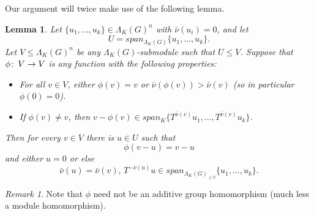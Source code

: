\documentclass{amsart}
\theoremstyle{plain}
\newtheorem{lemma}[theorem]{Lemma}
\theoremstyle{definition}
\theoremstyle{remark}
\newtheorem{remark}[theorem]{Remark}
\def\co{\colon\thinspace}
\def\barnu{\bar{\nu}}
\begin{document}
Our argument will twice make use of the following lemma.


\begin{lemma}\label{fixedpt}  Let $\{u_1,\ldots,u_k\}\in \Lambda_K(G)^n$ with $\barnu(u_i)=0$, and let \[ U=span_{\Lambda_K(G)}\{u_1,\ldots,u_k\}.\] Let $V\leq \Lambda_K(G)^n$ be any $\Lambda_K(G)$-submodule such that $U\leq V$.  Suppose that $\phi\co V\to V$ is any function with the following properties: \begin{itemize} \item[(i)] For all $v\in V$, either $\phi(v)=v$ or $\barnu(\phi(v))>\barnu(v)$ (so in particular $\phi(0)=0$).
\item[(ii)] If $\phi(v)\neq v$, then $v-\phi(v)\in span_K\{T^{\barnu(v)}u_1,\ldots,T^{\barnu(v)}u_k\}$.
\end{itemize}
Then for every $v\in V$ there is $u\in U$ such that \[ \phi(v-u)=v-u\] and either $u=0$ or else \[ \barnu(u)=\barnu(v),\, T^{-\barnu(u)}u\in span_{\Lambda_K(G)_{\geq 0}}\{u_1,\ldots,u_k\}.  \] 
\end{lemma}
\begin{remark} Note that $\phi$ need  not be an additive group homomorphism (much less a module homomorphism).\end{remark}
\end{document}
